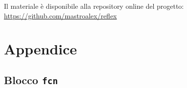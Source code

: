 Il materiale è disponibile alla repository online del progetto: \url{https://github.com/mastroalex/reflex}


\raggedbottom
\printbibliography[title=Riferimenti]

\clearpage
\onecolumn
\section*{Appendice}

\subsection{Blocco \texttt{fcn}}






